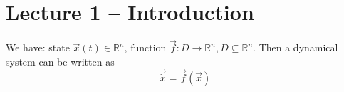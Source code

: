 \section{Lecture 1 -- Introduction}
We have: state $\vec x(t) \in \mathbb R^n$, function $\vec f: D \to \mathbb R^n, D \subseteq \mathbb R^n$. Then a dynamical system can be written as
\begin{equation}
	\vec{\dot x} = \vec f(\vec x)
\end{equation}